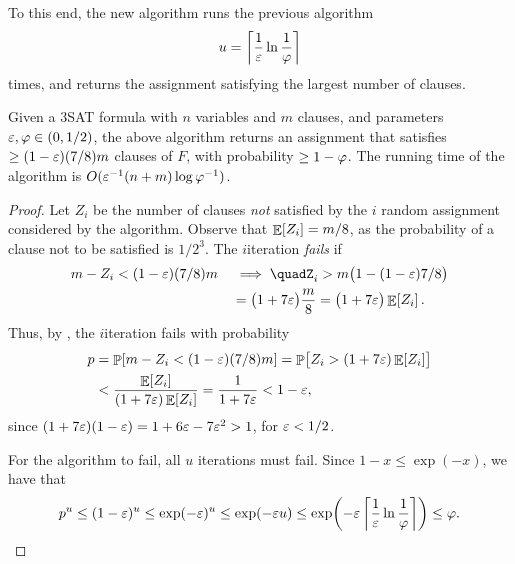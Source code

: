 To this end, the new algorithm runs the previous algorithm
\begin{equation*}
    u = \left\lceil {\frac{1}{{\varepsilon}}\ln \frac{1}{\varphi}} \right\rceil
\end{equation*}
times, and returns the assignment satisfying the largest number of
clauses.

\begin{lemma}
    Given a $3$SAT formula with $n$ variables and $m$ clauses, and
    parameters ${\varepsilon}, \varphi \in (0,1/2)$, the above algorithm
    returns an assignment that satisfies $\geq (1-{\varepsilon})(7/8)m$ clauses
    of $F$, with probability $\geq 1 - \varphi$. The running time of
    the algorithm is $O( {\varepsilon}^{-1} (n + m) \log \varphi^{-1} )$.
\end{lemma}

\begin{proof}
    Let $Z_i$ be the number of clauses \emph{not} satisfied by the $i$\th
    random assignment considered by the algorithm. Observe that
    $\mathop{\mathbb{E}}\!\left[ {Z_i} \right] = m/8$, as the probability of a clause not to be satisfied
    is $1/2^3$. The $i$\th iteration \emph{fails} if
    \begin{align*}
        m - Z_i < (1-\eps)(7/8)m
        \quad&\implies\quad%
        Z_i%
        >%
        m\bigl( 1- (1-\eps)7/8\bigr)
        \\&%
        =%
        \bigl( 1 + 7\eps \bigr) \frac{m}{8}
        =%
        \bigl( 1 + 7\eps \bigr) \Ex{Z_i}.
    \end{align*}
    Thus,
    by ,
    the $i$\th iteration fails with probability
    \begin{align*}
        p%
        &=%
        \Prob{ m - Z_i < (1-\eps)(7/8)m}%
        =%
        \Prob{Z_i > ( 1 + 7\eps ) \Ex{Z_i}\bigr.}%
        \\&<%
        \frac{\Ex{Z_i}}{( 1 + 7\eps ) \Ex{Z_i}}%
        =%
        \frac{1}{ 1 + 7\eps }%
        <%
        1-\eps,%
    \end{align*}
    since 
    $( 1 + 7{\varepsilon} )(1-{\varepsilon}) = 1 +6{\varepsilon} - 7{\varepsilon}^2 > 1$, for ${\varepsilon} <
    1/2$.

    For the algorithm to fail, all $u$ iterations must fail. Since
    $1-x \leq \exp(-x)$, we have that
    \begin{equation*}
        p^u %
        \leq
        (1-\eps)^u
        \leq
        \exp( -\eps)^u
        \leq
        \exp( -\eps u)
        \leq
        \exp\pth{-\eps  \ceil{\frac{1}{\eps}\ln \frac{1}{\BadProb}}}%
        \leq%
        \BadProb.
    \end{equation*}
\end{proof}

